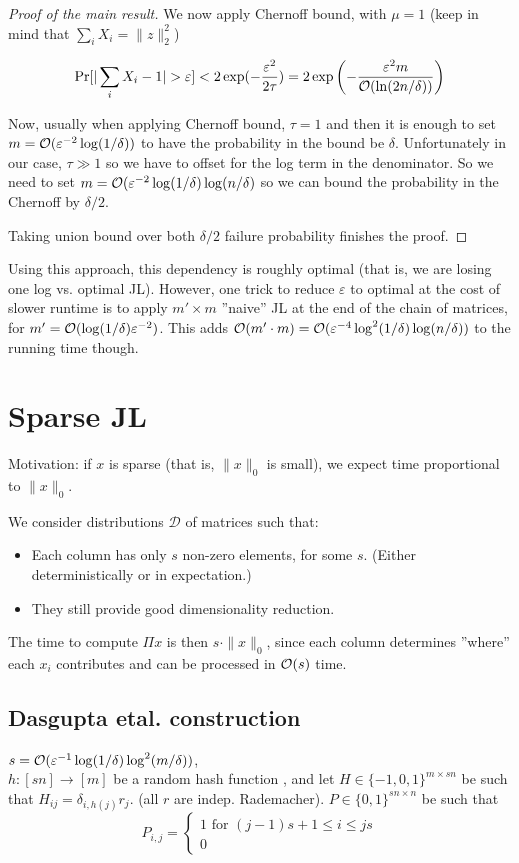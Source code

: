 \documentclass[11pt]{article}
\newcommand{\eps}{\varepsilon}
\begin{document}
\begin{proof}[Proof of the main result]
We now apply Chernoff bound, with $\mu = 1$ (keep in mind that $\sum_i X_i = \|z\|_2^2$)

$$\Pr[ | \sum_i X_i - 1| > \eps  ] < 2 \exp(- \frac{\eps^2 }{2 \tau} ) = 2 \exp\left(- \frac{\eps^2 m}{\bigo(\ln(2n/\delta)) }\right)$$


Now, usually when applying Chernoff bound, $\tau=1$ and then it is enough to set $m = \mathcal{O}(\varepsilon^{-2} \log (1/\delta))$ to have the probability in the bound be $\delta$. Unfortunately in our case, $\tau \gg 1$ so we have to offset for the log term in the denominator. So we need to set 
$m = \mathcal{O}(\varepsilon^{-2} \log (1/\delta) \log(n/\delta)$ so we can bound the probability in the Chernoff by $\delta/2$.

Taking union bound over both $\delta/2$ failure probability finishes the proof.
\end{proof}

Using this approach, this dependency is roughly optimal (that is, we are losing one log vs. optimal JL). However, one trick to reduce $\eps$ to optimal at the cost of slower runtime is to apply $m' \times m$ ''naive'' JL at the end of the chain of matrices, for $m' = \bigo(\log (1/\delta) \eps^{-2})$. This adds $\bigo(m' \cdot m) = \bigo(\eps^{-4} \log^2 (1/\delta) \log (n/\delta))$ to the running time though.

\section{Sparse JL \cite{DBLP:conf/stoc/DasguptaKS10}}

Motivation: if $x$ is sparse (that is, $\|x\|_0$ is small), we expect time proportional to $\|x\|_0$. 

We consider distributions $\mathcal{D}$ of matrices such that:
\begin{itemize}
\item Each column has only $s$ non-zero elements, for some $s$. (Either deterministically or in expectation.)
\item They still provide good dimensionality reduction.
\end{itemize}

The time to compute $\Pi x$ is then $s \cdot \|x\|_0$, since each column determines ''where'' each $x_i$ contributes and can be processed in $\mathcal{O}(s)$ time.

\subsection{Dasgupta etal. construction}
$s = \bigo(\eps^{-1} \log (1/\delta) \log^2 (m/\delta))$,\\ $h : [sn] \to [m]$ be a random hash function , and let
$H \in \{-1,0,1\}^{m \times sn}$ be such that $H_{ij} = \delta_{i,h(j)} r_j$. (all $r$ are indep. Rademacher).
$P \in \{0,1\}^{sn \times n}$ be such that
$$P_{i,j} = \begin{cases}1 \text{ for } (j-1)s + 1 \le i \le js\\0 \end{cases}$$
\end{document}
